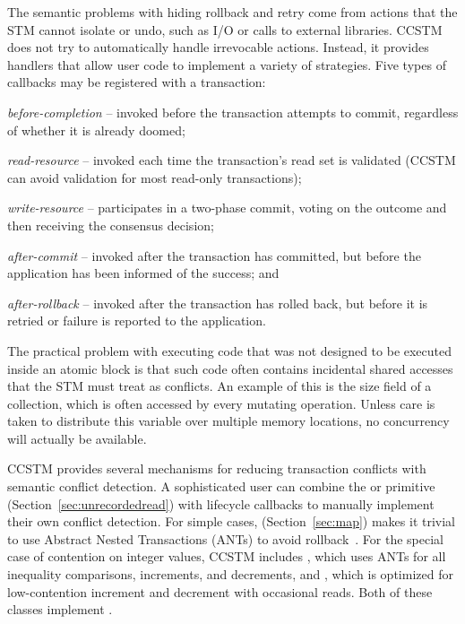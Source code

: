 The semantic problems with hiding rollback and retry come
from actions that the STM cannot isolate or undo, such as I/O or calls to
external libraries.
CCSTM does not try to automatically handle irrevocable actions.  Instead,
it provides handlers that allow user code to implement a variety of
strategies.  Five types of callbacks may be registered with a transaction:
\begin{packed_itemize}

\item{\it before-completion} -- invoked before the transaction attempts to
commit, regardless of whether it is already doomed;

\item{\it read-resource} -- invoked each time the transaction's read
set is validated (CCSTM can avoid validation for
most read-only transactions);

\item{\it write-resource} -- participates in a two-phase commit, voting on the
outcome and then receiving the consensus decision;

\item{\it after-commit} -- invoked after the transaction has committed, but
before the application has been informed of the success; and

\item{\it after-rollback} -- invoked after the transaction has rolled back, but
before it is retried or failure is reported to the application.

\end{packed_itemize}

The practical problem with executing code that was not designed to
be executed inside an atomic block is that such code often contains
incidental shared accesses that the STM must treat as conflicts.
An example of this is the size field of a collection, which is often
accessed by every mutating operation.  Unless care is taken to distribute
this variable over multiple memory locations, no concurrency will actually
be available.

CCSTM provides several mechanisms for reducing transaction conflicts with
semantic conflict detection.  A sophisticated user can combine the
 or  primitive (Section~\ref{sec:unrecordedread}) with
lifecycle callbacks to manually implement their own conflict detection.
For simple cases,  (Section~\ref{sec:map})
makes it trivial to use Abstract Nested Transactions (ANTs) to avoid
rollback~\cite{harris07abstract}.  For the special case of contention
on integer values, CCSTM includes , which
uses ANTs for all inequality comparisons, increments, and decrements, and
, which is optimized for low-contention increment
and decrement with occasional reads.  Both of these classes implement
.

